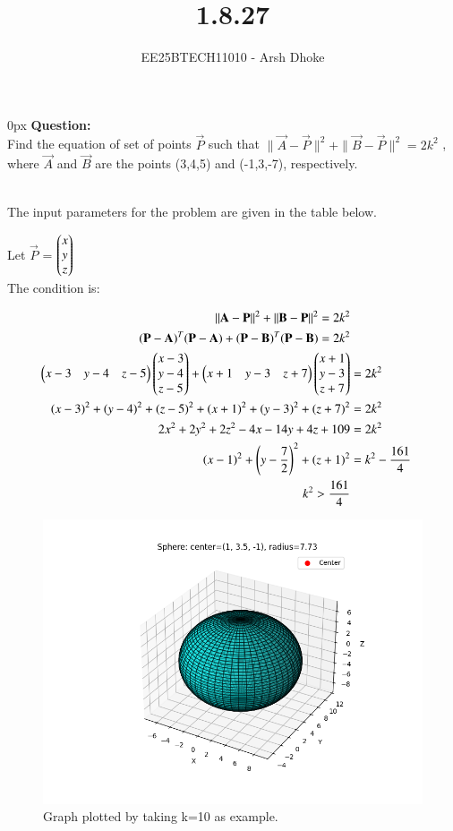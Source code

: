\documentclass[journal]{IEEEtran}
\begin{document}

\vspace{3cm}

\title{1.8.27}
\author{EE25BTECH11010 - Arsh Dhoke}
{\let\newpage\relax\maketitle}

\renewcommand{\thefigure}{\theenumi}
\renewcommand{\thetable}{\theenumi}
\setlength{\intextsep}{10pt}
\renewcommand{\thetable}{\theenumi}

\parindent 0px
\textbf{Question:} \\
Find the equation of set of points $\vec{P}$ such that $\|\vec{A}-\vec{P}\|^2 + \|\vec{B}-\vec{P}\|^2 = 2k^2 $
, where $\vec{A}$ and $\vec{B}$ are the points (3,4,5) and (-1,3,-7), respectively.

\solution \\

The input parameters for the problem are given in the table below.



Let $\vec{P}$ = $\begin{pmatrix}x \\ y \\ z\end{pmatrix}$ \\

The condition is:

\begin{align}
\|\mathbf{A}-\mathbf{P}\|^2 + \|\mathbf{B}-\mathbf{P}\|^2 = 2k^2  \\
(\mathbf{P}-\mathbf{A})^T(\mathbf{P}-\mathbf{A}) + (\mathbf{P}-\mathbf{B})^T(\mathbf{P}-\mathbf{B}) = 2k^2   \\
\begin{pmatrix}x-3 & y-4 & z-5\end{pmatrix}\begin{pmatrix}x-3\\y-4\\z-5\end{pmatrix}
+ \begin{pmatrix}x+1 & y-3 & z+7\end{pmatrix}\begin{pmatrix}x+1\\y-3\\z+7\end{pmatrix}
&= 2k^2  \\
(x-3)^2 + (y-4)^2 + (z-5)^2 + (x+1)^2 + (y-3)^2 + (z+7)^2 &= 2k^2  \\
2x^2 + 2y^2 + 2z^2 - 4x - 14y + 4z + 109 &= 2k^2  \\
(x-1)^2 + \left(y-\frac{7}{2}\right)^2 + (z+1)^2 &= k^2 - \frac{161}{4} \\
k^2>\frac{161}{4}
\end{align}

\begin{figure}[ht!]
\centering
\includegraphics[height=0.5\textheight, keepaspectratio]{figs/fig1.png}
\caption{Graph plotted by taking k=10 as example.}
\end{figure}
\end{document}
